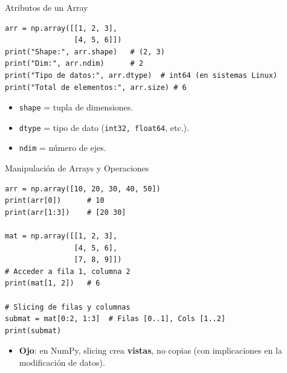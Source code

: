 \documentclass[10pt]{beamer}
\begin{document}
\begin{frame}[fragile]{Atributos de un Array}
\begin{verbatim}
arr = np.array([[1, 2, 3],
                [4, 5, 6]])
print("Shape:", arr.shape)   # (2, 3)
print("Dim:", arr.ndim)      # 2
print("Tipo de datos:", arr.dtype)  # int64 (en sistemas Linux)
print("Total de elementos:", arr.size) # 6
\end{verbatim}
\begin{itemize}
  \item \texttt{shape} = tupla de dimensiones.
  \item \texttt{dtype} = tipo de dato (\texttt{int32, float64}, etc.).
  \item \texttt{ndim} = número de ejes.
\end{itemize}
\end{frame}


\begin{frame}[fragile]{Manipulación de Arrays y Operaciones }
\begin{verbatim}
arr = np.array([10, 20, 30, 40, 50])
print(arr[0])      # 10
print(arr[1:3])    # [20 30]

mat = np.array([[1, 2, 3],
                [4, 5, 6],
                [7, 8, 9]])
# Acceder a fila 1, columna 2
print(mat[1, 2])   # 6

# Slicing de filas y columnas
submat = mat[0:2, 1:3]  # Filas [0..1], Cols [1..2]
print(submat)
\end{verbatim}
\begin{itemize}
  \item \textbf{Ojo}: en NumPy, slicing crea \textbf{vistas}, no copias (con implicaciones en la modificación de datos).
\end{itemize}
\end{frame}
\end{document}

